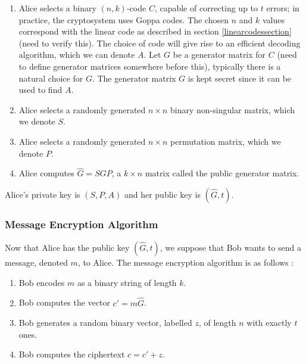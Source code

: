 \begin{enumerate}
    \item Alice selects a binary $(n, k)$-code $C$, capable of correcting up to $t$ errors; in practice, the cryptosystem uses Goppa codes. The chosen $n$ and $k$ values correspond with the linear code as described in section \ref{linearcodessection} \color{red}(need to verify this)\color{black}. The choice of code will give rise to an efficient decoding algorithm, which we can denote $A$. Let $G$ be a generator matrix for $C$ \color{red}(need to define generator matrices somewhere before this)\color{black}, typically there is a natural choice for $G$. The generator matrix $G$ is kept secret since it can be used to find $A$.
    
    \item Alice selects a randomly generated $n \times n$ binary non-singular matrix, which we denote $S$.
    
    \item Alice selects a randomly generated $n \times n$ permutation matrix, which we denote $P$.
    
    \item Alice computes $\hat G = SGP$, a $k \times n$ matrix called the public generator matrix.
\end{enumerate}
Alice's private key is $(S, P, A)$ and her public key is $\left(\hat G, t\right)$.

\subsubsection{Message Encryption Algorithm}

Now that Alice has the public key $\left(\hat G, t\right)$, we suppose that Bob wants to send a message, denoted $m$, to Alice. The message encryption algorithm is as follows \cite{1978DSNPR..44..114M}:

\begin{enumerate}
    \item Bob encodes $m$ as a binary string of length $k$.
    
    \item Bob computes the vector $c' = m \hat G$.
    
    \item Bob generates a random binary vector, labelled $z$, of length $n$ with exactly $t$ ones.
    
    \item Bob computes the ciphertext $c = c' + z$.
\end{enumerate}

